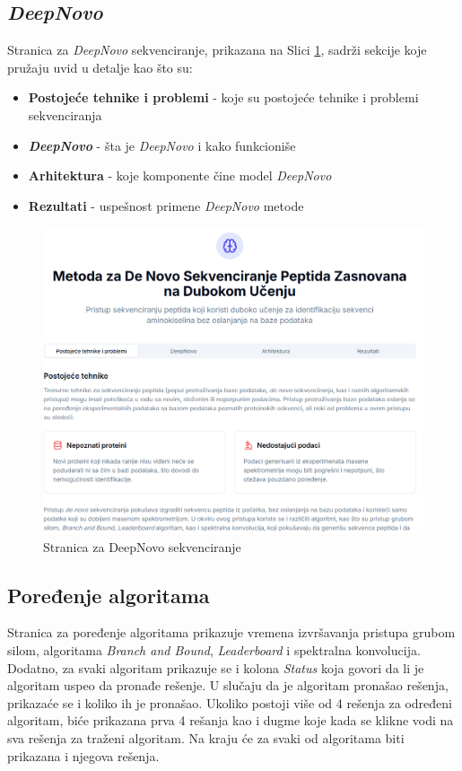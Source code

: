 \documentclass[12pt,oneside]{memoir}
\begin{document}
\subsection{\emph{DeepNovo}}
Stranica za \emph{DeepNovo} sekvenciranje, prikazana na Slici \ref{fig:deepnovo_1}, sadrži sekcije koje pružaju uvid u detalje kao što su:
\begin{itemize}
    \item \textbf{Postojeće tehnike i problemi} - koje su postojeće tehnike i problemi sekvenciranja
    \item \textbf{\emph{DeepNovo}} - šta je \emph{DeepNovo} i kako funkcioniše
    \item \textbf{Arhitektura} - koje komponente čine model \emph{DeepNovo}
    \item \textbf{Rezultati} - uspešnost primene \emph{DeepNovo} metode
\end{itemize}

\begin{figure}[H]
\centering
\includegraphics[width=1\textwidth]{images/deepnovo_1.png}
\caption{Stranica za DeepNovo sekvenciranje}
\label{fig:deepnovo_1}
\end{figure}

\subsection{Poređenje algoritama}

Stranica za poređenje algoritama prikazuje vremena izvršavanja pristupa grubom silom, algoritama \emph{Branch and Bound}, \emph{Leaderboard} i spektralna konvolucija. Dodatno, za svaki algoritam prikazuje se i kolona \textit{Status} koja govori da li je algoritam uspeo da pronađe rešenje. U slučaju da je algoritam pronašao rešenja, prikazaće se i koliko ih je pronašao. Ukoliko postoji više od 4 rešenja za određeni algoritam, biće prikazana prva 4 rešanja kao i dugme koje kada se klikne vodi na sva rešenja za traženi algoritam. Na kraju će za svaki od algoritama biti prikazana i njegova rešenja. 
\end{document}
